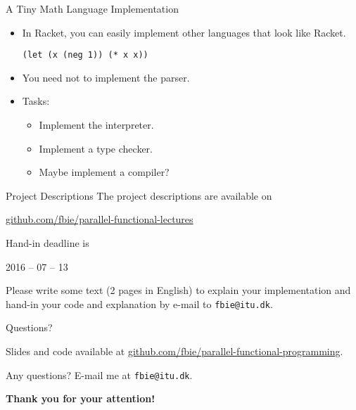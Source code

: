 \documentclass{beamer}
\begin{document}
\begin{frame}[fragile]{A Tiny Math Language Implementation}
  \begin{itemize}
  \item In Racket, you can easily implement other languages that look like Racket.
    \begin{lstlisting}[style=Racket]
(let (x (neg 1)) (* x x))
    \end{lstlisting}
  \pause{} \item You need not to implement the parser.
  \pause{} \item Tasks:
    \begin{itemize}
    \item Implement the interpreter.
    \item Implement a type checker.
    \item Maybe implement a compiler?
    \end{itemize}
  \end{itemize}
\end{frame}

\begin{frame}{Project Descriptions}
  The project descriptions are available on

  \begin{center}
    \url{github.com/fbie/parallel-functional-lectures}
  \end{center}

  Hand-in deadline is

  \begin{center}
    2016 -- 07 -- 13
  \end{center}

  Please write some text (2 pages in English) to explain your implementation and hand-in your code and explanation by e-mail to \texttt{fbie@itu.dk}.
\end{frame}

\begin{frame}{Questions?}
  \begin{center}
    Slides and code available at \url{github.com/fbie/parallel-functional-programming}.
  \end{center}

  \pause{}

  \begin{center}
    Any questions? E-mail me at \texttt{fbie@itu.dk}.
  \end{center}

  \pause{}

  \begin{center}
    \textbf{Thank you for your attention!}
  \end{center}
\end{frame}
\end{document}
